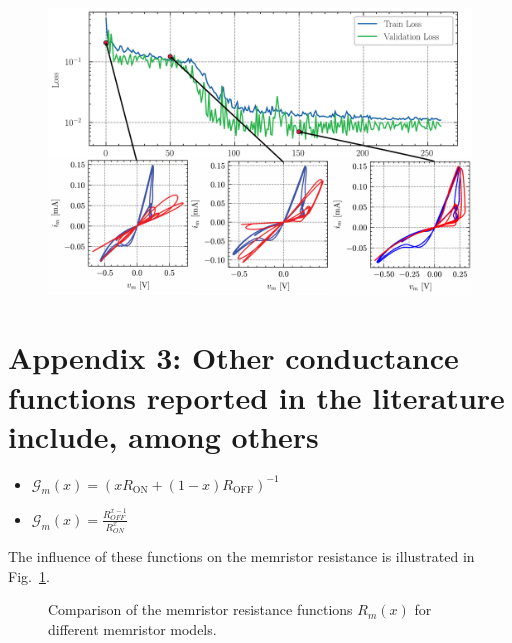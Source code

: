 \documentclass[11pt, oneside]{article}
\newcommand{\G}{\mathcal{G}}
\begin{document}
\begin{figure}[H]
    \centering
    \includegraphics[width=0.8\linewidth]{figs/Training_process.pdf}
    \caption*{}
\end{figure}


\section*{Appendix 3: Other conductance functions reported in the literature include, among others}
\begin{itemize}
    \item \(\G_m(x) = \left( x R_{\mathrm{ON}} + (1 - x) R_{\mathrm{OFF}} \right)^{-1}\)
    \item \(\G_m(x) = \frac{R_{OFF}^{x-1}}{R_{ON}^x}\)
\end{itemize}

The influence of these functions on the memristor resistance is illustrated in Fig.~\ref{fig:m-x}.

\begin{figure}[H]
    \centering
    \resizebox{0.5\linewidth}{!}{%
        
    }
    \caption{Comparison of the memristor resistance functions \(R_m(x)\) for different memristor models.}
    \label{fig:m-x}
\end{figure}

\printbibliography[heading=bibintoc]
\end{document}
